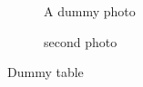 \documentclass{article}
\begin{document}
	\begin{figure}
		\caption{A dummy photo}
	\end{figure}
	\begin{figure}
		\caption{second photo}
	\end{figure}
	\begin{table}
		\caption{Dummy table}
	\end{table}

	\begin{appendix}
		\listoffigures
		\listoftables
	\end{appendix}
\end{document}
